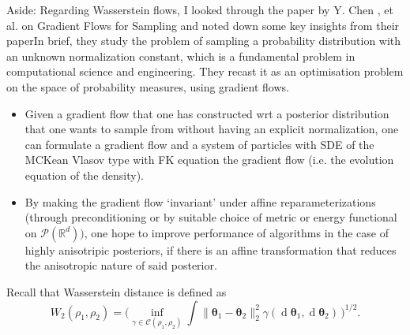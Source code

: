 \documentclass{article}
\theoremstyle{mystyle}
\newcommand{\R}{\ensuremath{\mathbb{R}}}
\newcommand{\diff}{\ensuremath{\operatorname{d}\!}}
\begin{document}
\begin{examplesblock}{Aside:}\label{aside: wasserstein flow}
Regarding Wasserstein flows, I looked through the paper by Y. Chen , et al. \cite{chen2023gradientflowssamplingmeanfield} on Gradient Flows for Sampling and noted down some key insights from their paperIn brief, they study the problem of sampling a probability distribution with an unknown normalization constant, which is a fundamental problem in computational science and engineering. They recast it as an optimisation problem on the space of probability measures, using gradient flows. 
\begin{itemize}
    
	\item 	Given a gradient flow that one has constructed wrt a posterior distribution that one wants to sample from without having an explicit normalization, one can formulate a gradient flow and a system of particles with SDE of the MCKean Vlasov type with FK equation the gradient flow (i.e. the evolution equation of the density). 
	\item 	By making the gradient flow ‘invariant’ under affine reparameterizations (through preconditioning or by suitable choice of metric or energy functional on $\mathcal{P}(\R^d))$, one hope to improve performance of algorithms in the case of highly anisotripic posteriors, if there is an affine transformation that reduces the anisotropic nature of said posterior.
\end{itemize}
\end{examplesblock}

Recall that Wasserstein distance is defined as
\begin{equation}\label{eq:Wasserstein_dual}
W_2(\rho_1,\rho_2)  = \Big(\inf_{\gamma\in \mathcal{C}(\rho_1,\rho_2)}  \int \| \mathbf{\theta}_1- \mathbf{\theta}_2 \|_2^2 \gamma( \diff  \mathbf{\theta}_1, \diff \mathbf{\theta}_2) \,\Big)^{1/2}. 
\end{equation}
\end{document}
